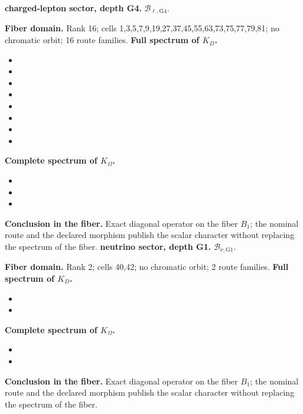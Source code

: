 \medskip
{}
\noindent\textbf{charged-lepton sector, depth G4.} \(\mathcal B_{\ell,\mathrm{G4}}\).\par
\noindent\textbf{Fiber domain.} Rank 16; cells 1,3,5,7,9,19,27,37,45,55,63,73,75,77,79,81; no chromatic orbit; 16 route families.
\noindent\textbf{Full spectrum of \(K_D\).}
\begin{itemize}
\item \texttt{}
\item \texttt{}
\item \texttt{}
\item \texttt{}
\item \texttt{}
\item \texttt{}
\item \texttt{}
\item \texttt{}
\end{itemize}
\noindent\textbf{Complete spectrum of \(K_\Omega\).}
\begin{itemize}
\item \texttt{}
\item \texttt{}
\item \texttt{}
\end{itemize}
\noindent\textbf{Conclusion in the fiber.} Exact diagonal operator on the fiber \(B_1\); the nominal route and the declared morphism publish the scalar character without replacing the spectrum of the fiber.
\medskip
{}
\noindent\textbf{neutrino sector, depth G1.} \(\mathcal B_{\nu,\mathrm{G1}}\).\par
\noindent\textbf{Fiber domain.} Rank 2; cells 40,42; no chromatic orbit; 2 route families.
\noindent\textbf{Full spectrum of \(K_D\).}
\begin{itemize}
\item \texttt{}
\item \texttt{}
\end{itemize}
\noindent\textbf{Complete spectrum of \(K_\Omega\).}
\begin{itemize}
\item \texttt{}
\item \texttt{}
\end{itemize}
\noindent\textbf{Conclusion in the fiber.} Exact diagonal operator on the fiber \(B_1\); the nominal route and the declared morphism publish the scalar character without replacing the spectrum of the fiber.
